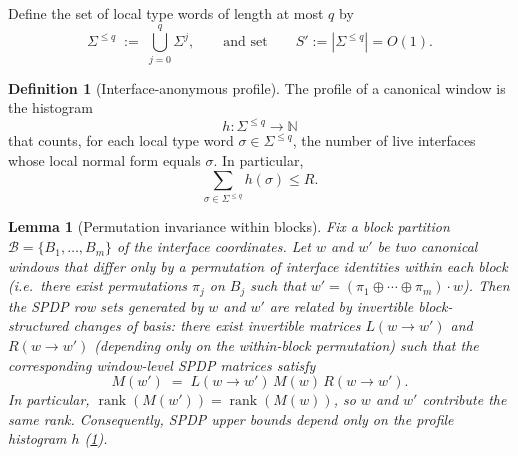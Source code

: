 \documentclass[12pt]{article}
\newtheorem{lemma}[theorem]{Lemma}
\theoremstyle{definition}
\newtheorem{definition}[theorem]{Definition}
\theoremstyle{remark}
\DeclareMathOperator{\rank}{rank}
\begin{document}
Define the set of local type words of length at most $q$ by
\[
  \Sigma^{\le q} \;:=\; \bigcup_{j=0}^{q} \Sigma^j,
  \qquad\text{and set}\qquad
  S' := |\Sigma^{\le q}| = O(1).
\]

\begin{definition}[Interface-anonymous profile]
\label{def:interface-anonymous-profile}
The profile of a canonical window is the histogram
\[
  h : \Sigma^{\le q} \to \mathbb{N}
\]
that counts, for each local type word $\sigma \in \Sigma^{\le q}$, the number of live interfaces
whose local normal form equals $\sigma$. In particular,
\[
  \sum_{\sigma \in \Sigma^{\le q}} h(\sigma) \le R.
\]
\end{definition}

\begin{lemma}[Permutation invariance within blocks]
\label{lem:block-perm-invariance}
Fix a block partition $\mathcal{B}=\{B_1,\dots,B_m\}$ of the interface coordinates.
Let $w$ and $w'$ be two canonical windows that differ only by a permutation of
interface identities \emph{within each block} (i.e.\ there exist permutations
$\pi_j$ on $B_j$ such that $w' = (\pi_1\oplus\cdots\oplus\pi_m)\cdot w$).
Then the SPDP row sets generated by $w$ and $w'$ are related by invertible
block-structured changes of basis: there exist invertible matrices $L(w\to w')$
and $R(w\to w')$ (depending only on the within-block permutation) such that the
corresponding window-level SPDP matrices satisfy
\[
M(w') \;=\; L(w\to w') \, M(w)\, R(w\to w').
\]
In particular, $\rank(M(w'))=\rank(M(w))$, so $w$ and $w'$ contribute the same rank.
Consequently, SPDP upper bounds depend only on the profile histogram $h$
(\ref{def:interface-anonymous-profile}).
\end{lemma}
\end{document}
